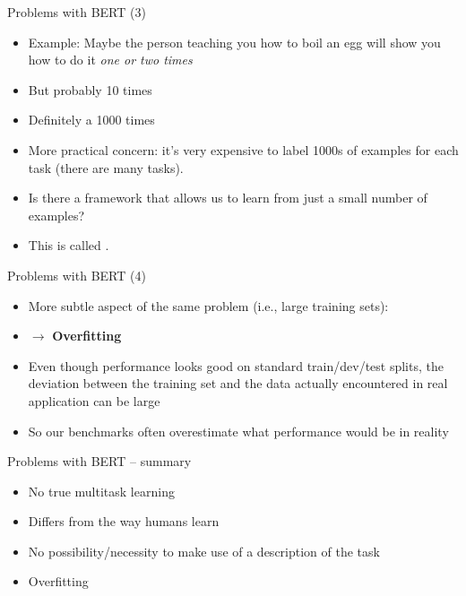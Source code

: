 \begin{frame}{Problems with BERT (3)}

\vfill

  \begin{itemize}
\item Example: Maybe the person teaching you how to boil an egg will show you how to do it \textit{one or two times}
\item But probably  10 times
\item Definitely  a 1000 times 
\item More practical concern: it's very expensive to label 1000s of examples for each task (there are many tasks).
\item \ques Is there a framework that allows us to learn from just a small number of examples?
\item This is called .
    \end{itemize}

\vfill

\end{frame}


\begin{frame}{Problems with BERT (4)}

\vfill

  \begin{itemize}
		\item More subtle aspect of the same problem (i.e., large training sets):
		\item[] $\to$ \textbf{Overfitting}
		\item Even though performance looks good on standard train/dev/test splits, the deviation between the training set and the
data actually encountered in real application can be large
		\item So our benchmarks often overestimate what performance would be in reality
  \end{itemize}

\vfill

\end{frame}


\begin{frame}{Problems with BERT -- summary}

\vfill

  \begin{itemize}
		\item No true multitask learning
		\item Differs from the way humans learn
		\item No possibility/necessity to make use of a description of the task
		\item Overfitting
  \end{itemize}

\vfill

\end{frame}

